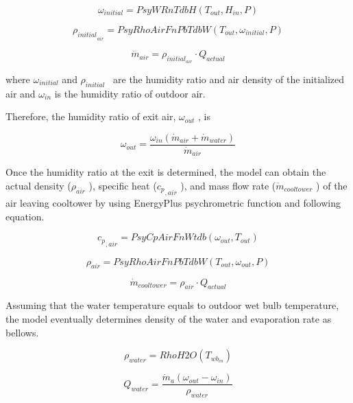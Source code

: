 \begin{equation}
{\omega_{initial}} = PsyWRnTdbH({T_{out}},{H_{in}},P)
\end{equation}

\begin{equation}
{\rho_{initial}}_{_{air}} = PsyRhoAirFnPbTdbW({T_{out}},{\omega_{initial}},P)
\end{equation}

\begin{equation}
{\dot m_{air}} = {\rho_{initia{l_{air}}}} \cdot {Q_{actual}}
\end{equation}

where \({\omega_{initial}}\) and \({\rho_{initial}}\) ~are the humidity ratio and air density of the initialized air and \({\omega_{in}}\) is the humidity ratio of outdoor air.

Therefore, the humidity ratio of exit air, \({\omega_{out}}\) , is

\begin{equation}
{\omega_{out}} = \frac{{{\omega_{in}}({{\dot m}_{air}} + {{\dot m}_{water}})}}{{{{\dot m}_{air}}}}
\end{equation}

Once the humidity ratio at the exit is determined, the model can obtain the actual density (\({\rho_{air}}\) ), specific heat (\({c_p}_{,air}\) ), and mass flow rate (\({\dot m_{cooltower}}\) ) of the air leaving cooltower by using EnergyPlus psychrometric function and following equation.

\begin{equation}
{c_p}_{,air} = PsyCpAirFnWtdb({\omega_{out}},{T_{out}})
\end{equation}

\begin{equation}
{\rho_{air}} = PsyRhoAirFnPbTdbW({T_{out}},{\omega_{out}},P)
\end{equation}

\begin{equation}
{\dot m_{cooltower}} = {\rho_{air}} \cdot {Q_{actual}}
\end{equation}

Assuming that the water temperature equals to outdoor wet bulb temperature, the model eventually determines density of the water and evaporation rate as bellows.

\begin{equation}
{\rho_{water}} = RhoH2O({T_{w{b_{in}}}})
\end{equation}

\begin{equation}
{Q_{water}} = \frac{{{{\dot m}_a}({\omega_{out}} - {\omega_{in}})}}{{{\rho_{water}}}}
\end{equation}

